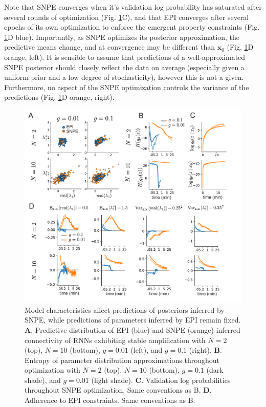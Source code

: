 \documentclass[11pt]{article}
\begin{document}
Note that SNPE converges when it's validation log probability has saturated after several rounds of optimization (Fig. \ref{fig:RNN2}C), and that EPI converges after several epochs of its own optimization to enforce the emergent property constraints (Fig. \ref{fig:RNN2}D blue).
Importantly, as SNPE optimizes its posterior approximation, the predictive means change, and at convergence may be different than $\mathbf{x}_0$ (Fig. \ref{fig:RNN2}D orange, left).
It is sensible to assume that predictions of a well-approximated SNPE posterior should closely reflect the data on average (especially given a uniform prior and a low degree of stochasticity), however this is not a given.
Furthermore, no aspect of the SNPE optimization controls the variance of the predictions (Fig. \ref{fig:RNN2}D orange, right).

\begin{figure}
\begin{center}
\includegraphics[scale=0.8]{figures/figRNN2/figRNN2.pdf}
\end{center}
\caption{Model characteristics affect predictions of posteriors inferred by SNPE, while predictions of parameters inferred by EPI remain fixed.
\textbf{A}. Predictive distribution of EPI (blue) and SNPE (orange) inferred connectivity of RNNs exhibiting stable amplification with $N=2$ (top), $N=10$ (bottom), $g=0.01$ (left), and $g=0.1$ (right).
\textbf{B}. Entropy of parameter distribution approximations throughout optimization with $N=2$ (top), $N=10$ (bottom), $g=0.1$ (dark shade), and $g=0.01$ (light shade).
\textbf{C}. Validation log probabilities throughout SNPE optimization. Same conventions as B.
\textbf{D}. Adherence to EPI constraints. Same conventions as B.
}
\label{fig:RNN2}
\end{figure}
\end{document}
